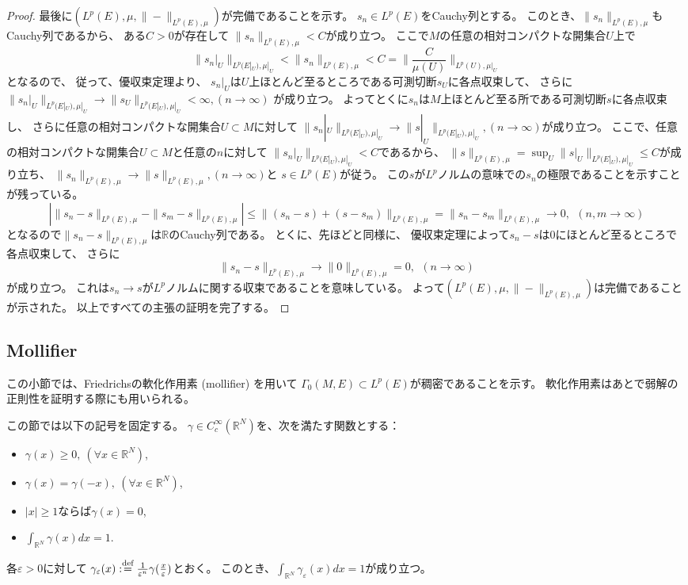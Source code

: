 \documentclass[uplatex]{jsarticle}
\theoremstyle{definition}
\newcommand{\ep}{\varepsilon}
\newcommand{\dfn}{:\overset{\mbox{{\scriptsize def}}}{=}}
\newcommand{\R}{\mathbb{R}}
\begin{document}
\begin{proof}
  最後に\((L^p(E),\mu,\|-\|_{L^p(E),\mu})\)が完備であることを示す。
  \(s_n\in L^p(E)\)をCauchy列とする。
  このとき、\(\|s_n\|_{L^p(E),\mu}\)もCauchy列であるから、
  ある\(C > 0\)が存在して
  \(\|s_n\|_{L^p(E),\mu} < C\)が成り立つ。
  ここで\(M\)の任意の相対コンパクトな開集合\(U\)上で
  \[\|s_n|_U\|_{L^p(E|_U),\mu|_U} < \|s_n\|_{L^p(E),\mu} < C = \|\frac{C}{\mu(U)}\|_{L^p(U),\mu|_U}\]
  となるので、
  従って、優収束定理より、
  \(s_n|_U\)は\(U\)上ほとんど至るところである可測切断\(s_U\)に各点収束して、
  さらに\(\|s_n|_U\|_{L^p(E|_U),\mu|_U} \to \|s_U\|_{L^p(E|_U),\mu|_U} < \infty, (n\to \infty)\)
  が成り立つ。
  よってとくに\(s_n\)は\(M\)上ほとんど至る所である可測切断\(s\)に各点収束し、
  さらに任意の相対コンパクトな開集合\(U\subset M\)に対して
  \(\|s_n|_U\|_{L^p(E|_U),\mu|_U} \to \|s|_U\|_{L^p(E|_U),\mu|_U}, (n\to \infty)\)が成り立つ。
  ここで、任意の相対コンパクトな開集合\(U\subset M\)と任意の\(n\)に対して
  \(\|s_n|_U\|_{L^p(E|_U),\mu|_U} < C\)であるから、
  \(\|s\|_{L^p(E),\mu} = \sup_U\|s|_U\|_{L^p(E|_U),\mu|_U} \leq C\)が成り立ち、
  \(\|s_n\|_{L^p(E),\mu} \to \|s\|_{L^p(E),\mu}, (n\to \infty)\)と
  \(s\in L^p(E)\)が従う。
  この\(s\)が\(L^p\)ノルムの意味での\(s_n\)の極限であることを示すことが残っている。
  \[
  \left| \|s_n - s\|_{L^p(E),\mu} - \|s_m - s\|_{L^p(E),\mu} \right|
  \leq \| (s_n - s) + (s - s_m) \|_{L^p(E),\mu}
  = \|s_n-s_m\|_{L^p(E),\mu} \to 0 ,  \ \ (n,m\to\infty)
  \]
  となるので\(\|s_n-s\|_{L^p(E),\mu}\)は\(\R\)のCauchy列である。
  とくに、先ほどと同様に、
  優収束定理によって\(s_n-s\)は\(0\)にほとんど至るところで各点収束して、
  さらに
  \[\|s_n-s\|_{L^p(E),\mu} \to \|0\|_{L^p(E),\mu} = 0, \ \ (n\to \infty)\]
  が成り立つ。
  これは\(s_n\to s\)が\(L^p\)ノルムに関する収束であることを意味している。
  よって\((L^p(E),\mu,\|-\|_{L^p(E),\mu})\)は完備であることが示された。
  以上ですべての主張の証明を完了する。
\end{proof}








\subsection{Mollifier}


この小節では、Friedrichsの軟化作用素 (mollifier) を用いて
\(\Gamma_0(M,E)\subset L^p(E)\)が稠密であることを示す。
軟化作用素はあとで弱解の正則性を証明する際にも用いられる。

この節では以下の記号を固定する。
\(\gamma \in C_c^{\infty}(\R^N)\)を、次を満たす関数とする：
\begin{itemize}
  \item
  \(\gamma(x) \geq 0, \ (\forall x\in \R^N)\),
  \item
  \(\gamma(x) = \gamma(-x), \ (\forall x\in \R^N)\),
  \item
  \(|x| \geq 1\)ならば\(\gamma(x) = 0\),
  \item
  \(\int_{\R^N}\gamma(x) dx = 1\).
\end{itemize}
各\(\ep > 0\)に対して
\(\gamma_{\ep}(x) \dfn \frac{1}{\ep^n}\gamma(\frac{x}{\ep})\)とおく。
このとき、\(\int_{\R^N}\gamma_{\ep}(x)dx = 1\)が成り立つ。
\end{document}
